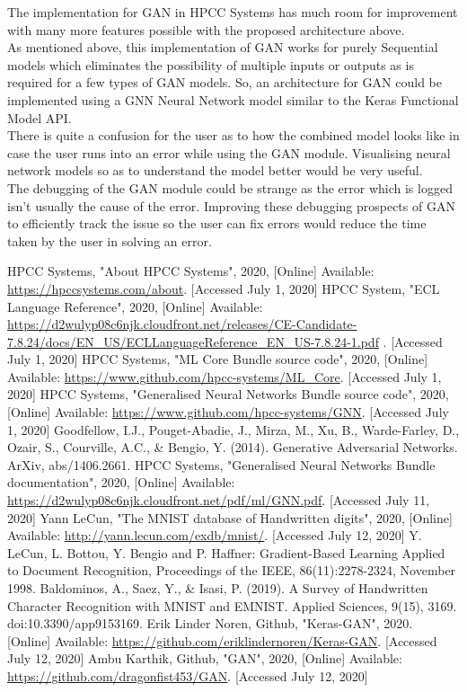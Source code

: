 \documentclass[conference]{IEEEtran}
\begin{document}
The implementation for GAN in HPCC Systems has much room for improvement with many more features possible with the proposed architecture above. 
\\
As mentioned above, this implementation of GAN works for purely Sequential models which eliminates the possibility of multiple inputs or outputs as is required for a few types of GAN models. So, an architecture for GAN could be implemented using a GNN Neural Network model similar to the Keras Functional Model API. 
\\
There is quite a confusion for the user as to how the combined model looks like in case the user runs into an error while using the GAN module. Visualising neural network models so as to understand the model better would be very useful.
\\
The debugging of the GAN module could be strange as the error which is logged isn't usually the cause of the error. Improving these debugging prospects of GAN to efficiently track the issue so the user can fix errors would reduce the time taken by the user in solving an error.


\begin{thebibliography}{00}
     HPCC Systems, "About HPCC Systems", 2020, [Online] Available:
    \url{https://hpccsystems.com/about}. [Accessed July 1, 2020]
     HPCC System, "ECL Language Reference", 2020, [Online] Available: \url{https://d2wulyp08c6njk.cloudfront.net/releases/CE-Candidate-7.8.24/docs/EN_US/ECLLanguageReference_EN_US-7.8.24-1.pdf} . [Accessed July 1, 2020]
     HPCC Systems, "ML Core Bundle source code", 2020, [Online] Available:
    \url{https://www.github.com/hpcc-systems/ML_Core}. [Accessed July 1, 2020]
     HPCC Systems, "Generalised Neural Networks Bundle source code", 2020, [Online] Available: 
    \url{https://www.github.com/hpcc-systems/GNN}. [Accessed July 1, 2020]
     Goodfellow, I.J., Pouget-Abadie, J., Mirza, M., Xu, B., Warde-Farley, D., Ozair, S., Courville, A.C., \& Bengio, Y. (2014). Generative Adversarial Networks. ArXiv, abs/1406.2661.
     HPCC Systems, "Generalised Neural Networks Bundle documentation", 2020, [Online] Available: \url{https://d2wulyp08c6njk.cloudfront.net/pdf/ml/GNN.pdf}. [Accessed July 11, 2020]
     Yann LeCun, "The MNIST database of Handwritten digits", 2020, [Online] Available: \url{http://yann.lecun.com/exdb/mnist/}. [Accessed July 12, 2020]
     	Y. LeCun, L. Bottou, Y. Bengio and P. Haffner: Gradient-Based Learning Applied to Document Recognition, Proceedings of the IEEE, 86(11):2278-2324, November 1998.
     Baldominos, A., Saez, Y., \& Isasi, P. (2019). A Survey of Handwritten Character Recognition with MNIST and EMNIST. Applied Sciences, 9(15), 3169. doi:10.3390/app9153169.
     Erik Linder Noren, Github, "Keras-GAN", 2020. [Online] Available:
    \url{https://github.com/eriklindernoren/Keras-GAN}. [Accessed July 12, 2020]
     Ambu Karthik, Github, "GAN", 2020, [Online] Available:
    \url{https://github.com/dragonfist453/GAN}. [Accessed July 12, 2020]
\end{thebibliography}
\end{document}
